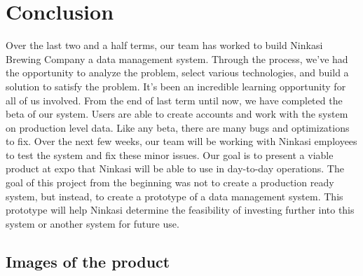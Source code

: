 \documentclass[draftclsnofoot,onecolumn,letterpaper,10pt,compsoc]{IEEEtran}
\begin{document}
\section{Conclusion}
Over the last two and a half terms, our team has worked to build Ninkasi Brewing Company a data management system.
Through the process, we've had the opportunity to analyze the problem, select various technologies, and build a solution to satisfy the problem.
It's been an incredible learning opportunity for all of us involved.
From the end of last term until now, we have completed the beta of our system.
Users are able to create accounts and work with the system on production level data.
Like any beta, there are many bugs and optimizations to fix.
Over the next few weeks, our team will be working with Ninkasi employees to test the system and fix these minor issues.
Our goal is to present a viable product at expo that Ninkasi will be able to use in day-to-day operations.
The goal of this project from the beginning was not to create a production ready system, but instead, to create a prototype of a data management system.
This prototype will help Ninkasi determine the feasibility of investing further into this system or another system for future use.


\subsection{Images of the product}
\end{document}
